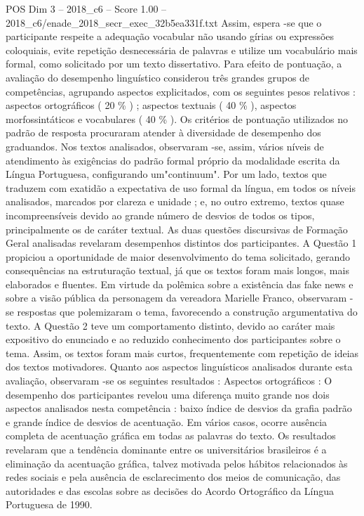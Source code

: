 \begin{textsample}{POS Dim 3 – 2018\_c6 – Score 1.00 – 2018\_c6/enade\_2018\_secr\_exec\_32b5ea331f.txt}
Assim, espera -se que o participante respeite a adequação vocabular não usando gírias ou expressões coloquiais, evite repetição desnecessária de palavras e utilize um vocabulário mais formal, como solicitado por um texto dissertativo.
Para efeito de pontuação, a avaliação do desempenho linguístico considerou três grandes grupos de competências, agrupando aspectos explicitados, com os seguintes pesos relativos : aspectos ortográficos ( 20 \% ) ; aspectos textuais ( 40 \% ), aspectos morfossintáticos e vocabulares ( 40 \% ).
Os critérios de pontuação utilizados no padrão de resposta procuraram atender à diversidade de desempenho dos graduandos.
Nos textos analisados, observaram -se, assim, vários níveis de atendimento às exigências do padrão formal próprio da modalidade escrita da Língua Portuguesa, configurando um"continuum".
Por um lado, textos que traduzem com exatidão a expectativa de uso formal da língua, em todos os níveis analisados, marcados por clareza e unidade ; e, no outro extremo, textos quase incompreensíveis devido ao grande número de desvios de todos os tipos, principalmente os de caráter textual.
As duas questões discursivas de Formação Geral analisadas revelaram desempenhos distintos dos participantes.
A Questão 1 propiciou a oportunidade de maior desenvolvimento do tema solicitado, gerando consequências na estruturação textual, já que os textos foram mais longos, mais elaborados e fluentes.
Em virtude da polêmica sobre a existência das fake news e sobre a visão pública da personagem da vereadora Marielle Franco, observaram -se respostas que polemizaram o tema, favorecendo a construção argumentativa do texto.
A Questão 2 teve um comportamento distinto, devido ao caráter mais expositivo do enunciado e ao reduzido conhecimento dos participantes sobre o tema.
Assim, os textos foram mais curtos, frequentemente com repetição de ideias dos textos motivadores.
Quanto aos aspectos linguísticos analisados durante esta avaliação, observaram -se os seguintes resultados : Aspectos ortográficos : O desempenho dos participantes revelou uma diferença muito grande nos dois aspectos analisados nesta competência : baixo índice de desvios da grafia padrão e grande índice de desvios de acentuação.
Em vários casos, ocorre ausência completa de acentuação gráfica em todas as palavras do texto.
Os resultados revelaram que a tendência dominante entre os universitários brasileiros é a eliminação da acentuação gráfica, talvez motivada pelos hábitos relacionados às redes sociais e pela ausência de esclarecimento dos meios de comunicação, das autoridades e das escolas sobre as decisões do Acordo Ortográfico da Língua Portuguesa de 1990.

\end{textsample}
